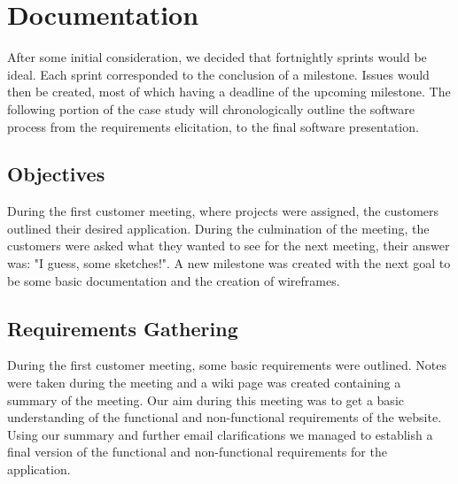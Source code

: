 \documentclass{l3proj}
\begin{document}
\section{Documentation}
\label{documentation}

After some initial consideration, we decided that fortnightly sprints would be ideal. Each sprint corresponded to the conclusion of a milestone. Issues would then be created, most of which having a deadline of the upcoming milestone. The following portion of the case study will chronologically outline the software process from the requirements elicitation, to the final software presentation.

\subsection{Objectives}
\label{sec:objectives}

During the first customer meeting, where projects were assigned, the customers outlined their desired application. During the culmination of the meeting, the customers were asked what they wanted to see for the next meeting, their answer was: "I guess, some sketches!". A new milestone was created with the next goal to be some basic documentation and the creation of wireframes.

\subsection{Requirements Gathering}
\label{requirements}

During the first customer meeting, some basic requirements were outlined. Notes were taken during the meeting and a wiki page was created containing a summary of the meeting. Our aim during this meeting was to get a basic understanding of the functional and non-functional requirements of the website. Using our summary and further email clarifications we managed to establish a final version of the functional and non-functional requirements for the application.
\end{document}
